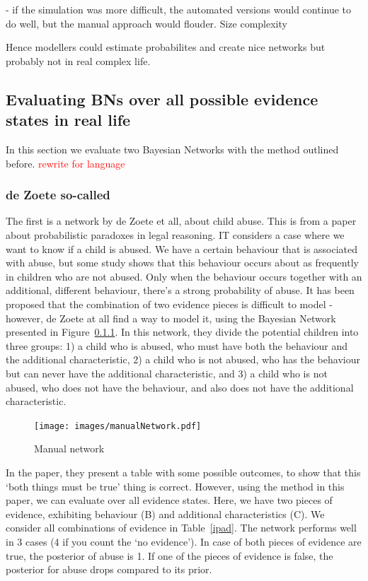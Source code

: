 \documentclass[12pt]{article}
\begin{document}
- if the simulation was more difficult, the automated versions would continue to do well, but the manual approach would flouder. Size complexity

Hence modellers could estimate probabilites and create nice networks but probably not in real complex life.



\subsection{Evaluating BNs over all possible evidence states in real life}

In this section we evaluate two Bayesian Networks with the method outlined before. 
 \textcolor{red} {rewrite for language}
 
 \subsubsection{de Zoete so-called}
 
 
 The first is a network by de Zoete et all, about child abuse. This is from a paper about probabilistic paradoxes in legal reasoning. IT considers a case where we want to know if a child is abused. We have a certain behaviour that is associated with abuse, but some study shows that this behaviour occurs about as frequently in children who are not abused. Only when the behaviour occurs together with an additional, different behaviour, there's a strong probability of abuse. It has been proposed that the combination of two evidence pieces is difficult to model - however, de Zoete at all find a way to model it, using the  Bayesian Network presented in Figure~\ref{}. In this network, they divide the potential children into three groups: 1) a child who is abused, who must have both the behaviour and the additional characteristic, 2) a child who is not abused, who has the behaviour but can never have the additional characteristic, and 3) a child who is not abused, who does not have the behaviour, and also does not have the additional characteristic.
 
 
 
 
 \begin{figure}[htbp]
\begin{center}
\texttt{[image: images/manualNetwork.pdf]}
\caption{Manual network}
\label{ }
\end{center}
\end{figure}


In the paper, they present a table with some possible outcomes, to show that this `both things must be true' thing is correct. However, using the method in this paper, we can evaluate over all evidence states. Here, we have two pieces of evidence, exhibiting behaviour (B) and additional characteristics (C). We consider all combinations of evidence in Table~\ref{ipad}. The network performs well in 3 cases (4 if you count the `no evidence'). In case of both pieces of evidence are true, the posterior of abuse is 1. If one of the pieces of evidence is false, the posterior for abuse drops compared to its prior.  
\end{document}
